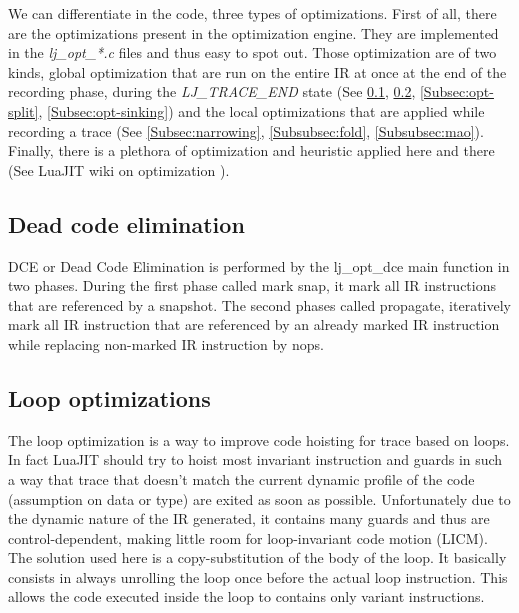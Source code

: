 
We can differentiate in the code, three types of optimizations.
First of all, there are the optimizations present in the optimization engine.
They are implemented in the \emph{lj\_opt\_*.c} files and thus easy to spot out.
Those optimization are of two kinds, global optimization that are run on the
entire IR at once at the end of the recording phase, during the
\emph{LJ\_TRACE\_END} state (See \ref{Subsec:opt-dce}, \ref{Subsec:opt-loop},
\ref{Subsec:opt-split}, \ref{Subsec:opt-sinking}) and the local optimizations
that are applied while recording a trace (See \ref{Subsec:narrowing},
\ref{Subsubsec:fold}, \ref{Subsubsec:mao}). Finally, there is a plethora of
optimization and heuristic applied here and there (See LuaJIT wiki on
optimization \cite{luajit-opt}).


\subsection{Dead code elimination}
\label{Subsec:opt-dce}

DCE or Dead Code Elimination is performed by the lj\_opt\_dce main function
in two phases. During the first phase called mark snap, it mark all IR
instructions that are referenced by a snapshot. The second phases called
propagate, iteratively mark all IR instruction that are referenced by an already
marked IR instruction while replacing non-marked IR instruction by nops.


\subsection{Loop optimizations}
\label{Subsec:opt-loop}

The loop optimization is a way to improve code hoisting for trace based on
loops. In fact LuaJIT should try to hoist most invariant instruction and guards
in such a way that trace that doesn't match the current dynamic profile of
the code (assumption on data or type) are exited as soon as possible.
Unfortunately due to the dynamic nature of the IR generated, it contains many
guards and thus are control-dependent, making little room for loop-invariant
code motion (LICM). The solution used here is a copy-substitution of the body
of the loop. It basically consists in always unrolling the loop once before the
actual loop instruction. This allows the code executed inside the loop to
contains only variant instructions.

